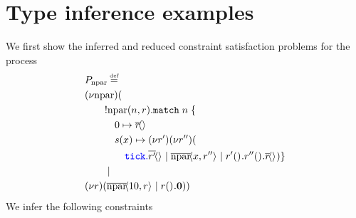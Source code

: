 \chapter{Type inference examples}\label{app:runningexm}

We first show the inferred and reduced constraint satisfaction problems for the process
\begin{align*}
    &\kern0em P_{\text{npar}} \defeq\\
    &(\nu \text{npar})(\\
    &\kern2em !\text{npar}(n,r).\texttt{match}\; n\; \{\\
    &\kern3em 0 \mapsto \asyncoutputch{r}{}{}\\
    &\kern3em s(x) \mapsto (\nu r' )(\nu r'' )(\\
    &\kern4em {\color{blue} \tick{{\color{black} \asyncoutputch{r'}{}{}}} } \mid
 \asyncoutputch{\text{npar}}{x,r''}{} \mid \inputch{r'}{}{}{\inputch{r''}{}{}{\asyncoutputch{r}{}{}}}) \} \\
    &\kern2em \mid \\
    &(\nu r)( \asyncoutputch{\text{npar}}{10,r}{} \mid \inputch{r}{}{}{\nil} ))
\end{align*}
We infer the following constraints

